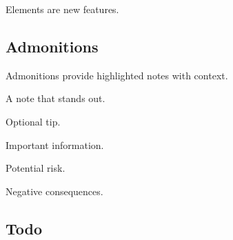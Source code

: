 \documentclass[10pt,titlepage]{article}
\begin{document}
Elements are new features.


\subsection{Admonitions}

Admonitions provide highlighted notes with context.

\begin{example}
\begin{note}
  A note that stands out.
\end{note}
\end{example}

\begin{example}
\begin{tip}
  Optional tip.
\end{tip}
\end{example}

\begin{example}
\begin{important}
  Important information.
\end{important}
\end{example}

\begin{example}
\begin{caution}
  Potential risk.
\end{caution}
\end{example}

\begin{example}
\begin{danger}
  Negative consequences.
\end{danger}
\end{example}


\subsection{Todo}

\makeatletter
\let\old@stz@warning\@stz@warning
\let\@stz@warning\@gobble
\makeatother
\end{document}
